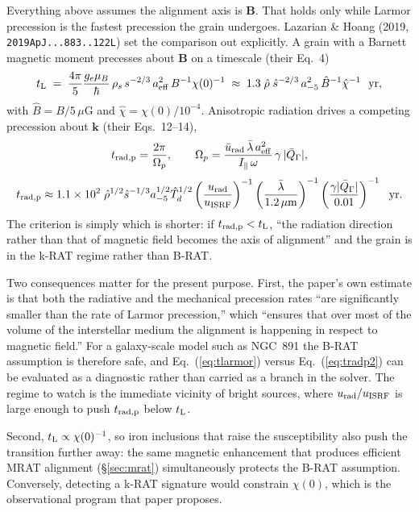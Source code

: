 \documentclass{my_memo}
\let\mathbf\boldsymbol
\newcommand{\code}[1]{\texttt{#1}}
\begin{document}
Everything above assumes the alignment axis is $\mathbf{B}$. That holds only
while Larmor precession is the fastest precession the grain undergoes.
Lazarian \& Hoang (2019, \code{2019ApJ...883..122L}) set the comparison out
explicitly. A grain with a Barnett magnetic moment precesses about
$\mathbf{B}$ on a timescale (their Eq.~4)
%
\begin{equation}
t_{\rm L} \;=\; \frac{4\pi}{5}\frac{g_e\mu_B}{\hbar}\,
   \rho_s\,s^{-2/3}\,a_{\rm eff}^{2}\,B^{-1}\chi(0)^{-1}
   \;\approx\; 1.3\;\hat\rho\;\hat s^{-2/3}\,a_{-5}^{2}\,
   \hat B^{-1}\hat\chi^{-1}\ \ {\rm yr},
\label{eq:tlarmor}
\end{equation}
%
with $\hat B = B/5\,\mu$G and $\hat\chi = \chi(0)/10^{-4}$. Anisotropic
radiation drives a competing precession about $\mathbf{k}$ (their
Eqs.~12--14),
%
\begin{equation}
t_{\rm rad,p} = \frac{2\pi}{\Omega_p},\qquad
\Omega_p = \frac{\bar u_{\rm rad}\,\bar\lambda\,a_{\rm eff}^{2}}
                {I_\parallel\,\omega}\,\gamma\,|\bar Q_\Gamma|,
\label{eq:tradp}
\end{equation}
%
\begin{equation}
t_{\rm rad,p} \approx 1.1\times10^{2}\;
  \hat\rho^{1/2}\hat s^{-1/3} a_{-5}^{1/2}\hat T_d^{1/2}
  \left(\frac{u_{\rm rad}}{u_{\rm ISRF}}\right)^{-1}
  \left(\frac{\bar\lambda}{1.2\,\mu\mathrm{m}}\right)^{-1}
  \left(\frac{\gamma|\bar Q_\Gamma|}{0.01}\right)^{-1}\ \ {\rm yr}.
\label{eq:tradp2}
\end{equation}
%
The criterion is simply which is shorter: if $t_{\rm rad,p} < t_{\rm L}$,
``the radiation direction rather than that of magnetic field becomes the axis
of alignment'' and the grain is in the k-RAT regime rather than B-RAT.

Two consequences matter for the present purpose. First, the paper's own
estimate is that both the radiative and the mechanical precession rates ``are
significantly smaller than the rate of Larmor precession,'' which ``ensures
that over most of the volume of the interstellar medium the alignment is
happening in respect to magnetic field.'' For a galaxy-scale model such as
NGC~891 the B-RAT assumption is therefore safe, and Eq.~(\ref{eq:tlarmor})
versus Eq.~(\ref{eq:tradp2}) can be evaluated as a diagnostic rather than
carried as a branch in the solver. The regime to watch is the immediate
vicinity of bright sources, where $u_{\rm rad}/u_{\rm ISRF}$ is large enough
to push $t_{\rm rad,p}$ below $t_{\rm L}$.

Second, $t_{\rm L} \propto \chi(0)^{-1}$, so iron inclusions that raise the
susceptibility also push the transition further away: the same magnetic
enhancement that produces efficient MRAT alignment
(\S\ref{sec:mrat}) simultaneously protects the B-RAT assumption. Conversely,
detecting a k-RAT signature would constrain $\chi(0)$, which is the
observational program that paper proposes.
\end{document}
